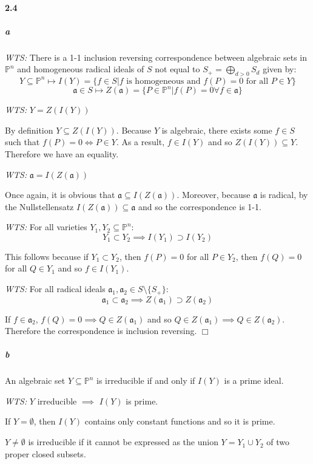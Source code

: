 \documentclass{article}
\begin{document}
\paragraph{2.4}
\subparagraph{a}
\emph{WTS:} There is a 1-1 inclusion reversing correspondence between algebraic sets in $\mathbb{P}^n$ and homogeneous radical ideals of $S$ not equal to $S_+ = \bigoplus_{d>0} S_d$ given by:
\[ Y \subseteq \mathbb{P}^n \mapsto I(Y) = \{ f \in S | f \textrm{ is homogeneous and } f(P) = 0 \textrm{ for all } P \in Y \} \]
\[ \mathfrak{a} \in S \mapsto Z(\mathfrak{a}) = \{ P \in \mathbb{P}^n | f(P) = 0 \forall f \in \mathfrak{a} \} \]

\emph{WTS:} $Y = Z(I(Y))$

By definition $Y \subseteq Z(I(Y))$. Because $Y$ is algebraic, there exists some $f \in S$ such that $f(P) = 0 \Leftrightarrow P \in Y$.  As a result, $f \in I(Y)$ and so $Z(I(Y)) \subseteq Y$.  Therefore we have an equality.

\emph{WTS:} $\mathfrak{a} = I(Z(\mathfrak{a}))$

Once again, it is obvious that $\mathfrak{a} \subseteq I(Z(\mathfrak{a}))$.  Moreover, because $\mathfrak{a}$ is radical, by the Nullstellensatz $I(Z(\mathfrak{a})) \subseteq \mathfrak{a}$ and so the correspondence is 1-1.

\emph{WTS:} For all varieties $Y_1, Y_2 \subseteq \mathbb{P}^n$:
\[ Y_1 \subset Y_2 \implies I(Y_1) \supset I(Y_2) \]

This follows because if $Y_1 \subset Y_2$, then $f(P) = 0$ for all $P \in Y_2$, then $f(Q) = 0$ for all $Q \in Y_1$ and so $f \in I(Y_1)$.

\emph{WTS:} For all radical ideals $\mathfrak{a}_1, \mathfrak{a}_2 \in S \setminus \{ S_+ \}$:
\[ \mathfrak{a}_1 \subset \mathfrak{a}_2 \implies Z(\mathfrak{a}_1) \supset Z(\mathfrak{a}_2) \]

If $f \in \mathfrak{a_2}$, $f(Q) = 0 \implies Q \in Z(\mathfrak{a_1})$ and so $Q \in Z(\mathfrak{a}_1) \implies Q \in Z(\mathfrak{a}_2)$.  Therefore the correspondence is inclusion reversing.  $\Box$

\subparagraph{b}
An algebraic set $Y \subseteq \mathbb{P}^n$ is irreducible if and only if $I(Y)$ is a prime ideal.

\emph{WTS:} $Y$ irreducible $\implies$ $I(Y)$ is prime.

If $Y = \emptyset$, then $I(Y)$ contains only constant functions and so it is prime.

$Y \neq \emptyset$ is irreducible if it cannot be expressed as the union $Y = Y_1 \cup Y_2$ of two proper closed subsets.
\end{document}
